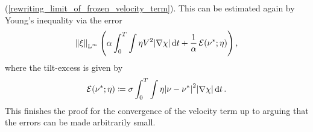 (\ref{rewriting_limit_of_frozen_velocity_term}). This can be estimated again by 
Young's inequality via the error
\begin{equation*}
	\norm{ \xi }_{ \lp^{ \infty } }
	\left(
	\alpha
	\int_{ 0 }^{ T }
	\int
	\eta
	V^{ 2 }
	\abs{ \nabla \chi }
	\dd{ t }
	+
	\frac{ 1 }{ \alpha }
	\tilt_excess ( \nu^{ \ast }; \eta )
	\right),
\end{equation*}
where the tilt-excess is given by 
\begin{equation*}
	\tilt_excess ( \nu^{ \ast } ; \eta )
	\coloneqq
	\sigma
	\int_{ 0 }^{ T }
	\int
	\eta
	\abs{ \nu - \nu^{ \ast } }^{ 2 }
	\abs{ \nabla \chi }
	\dd{ t }.
\end{equation*}
This finishes the proof for the convergence of the velocity term up to arguing 
that the errors can be made arbitrarily small.

